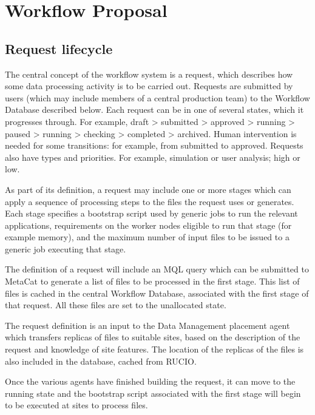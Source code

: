 \documentclass[../main-v1.tex]{subfiles}
\begin{document}
\section{Workflow Proposal } 
\subsection{Request lifecycle}
\label{sec:flow:lifecycle}

The central concept of the workflow system is a request, which describes how some data processing activity is to be carried out. Requests are submitted by users (which may include members of a central production team) to the Workflow Database described below. Each request can be in one of several states, which it progresses through. For example, draft > submitted > approved > running > paused > running > checking > completed > archived. Human intervention is needed for some transitions: for example, from submitted to approved. Requests also have types and priorities. For example, simulation or user analysis; high or low.

As part of its definition, a request may include one or more stages which can apply a sequence of processing steps to the files the request uses or generates. Each stage specifies a bootstrap script used by generic jobs to run the relevant applications, requirements on the worker nodes eligible to run that stage (for example memory), and the maximum number of input files to be issued to a generic job executing that stage.

The definition of a request will include an MQL query which can be submitted to MetaCat to generate a list of files to be processed in the first stage. This list of files is cached in the central Workflow Database, associated with the first stage of that request. All these files are set to the unallocated state. 

The request definition is an input to the Data Management placement agent which transfers replicas of files to suitable sites, based on the description of the request and knowledge of site features. The location of the replicas of the files is also included in the database, cached from RUCIO. 

Once the various agents have finished building the request, it can move to the running state and the bootstrap script associated with the first stage will begin to be executed at sites to process files.
\end{document}
